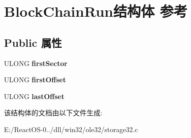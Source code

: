 \hypertarget{struct_block_chain_run}{}\section{Block\+Chain\+Run结构体 参考}
\label{struct_block_chain_run}
\subsection*{Public 属性}
\begin{DoxyCompactItemize}
\item 
\mbox{\label{struct_block_chain_run_a85145eac0524543cbde98ae911119deb}} 
U\+L\+O\+NG {\bfseries first\+Sector}
\item 
\mbox{\label{struct_block_chain_run_a29036c59e7670a2d02ef3cdbf7ff60d1}} 
U\+L\+O\+NG {\bfseries first\+Offset}
\item 
\mbox{\label{struct_block_chain_run_a9855c96e3d3d7f5d9b551cda10445c64}} 
U\+L\+O\+NG {\bfseries last\+Offset}
\end{DoxyCompactItemize}


该结构体的文档由以下文件生成\+:\begin{DoxyCompactItemize}
\item 
E\+:/\+React\+O\+S-\/0../dll/win32/ole32/storage32.\+c\end{DoxyCompactItemize}
